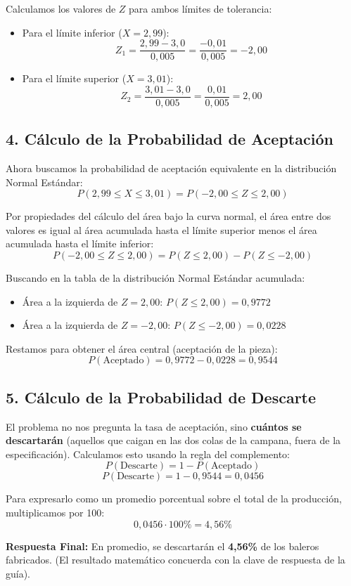 \documentclass[11pt, a4paper]{article}
\begin{document}
Calculamos los valores de $Z$ para ambos límites de tolerancia:
\begin{itemize}
    \item Para el límite inferior ($X = 2,99$): 
    \[ Z_1 = \frac{2,99 - 3,0}{0,005} = \frac{-0,01}{0,005} = -2,00 \]
    
    \item Para el límite superior ($X = 3,01$): 
    \[ Z_2 = \frac{3,01 - 3,0}{0,005} = \frac{0,01}{0,005} = 2,00 \]
\end{itemize}

\subsection*{4. Cálculo de la Probabilidad de Aceptación}
Ahora buscamos la probabilidad de aceptación equivalente en la distribución Normal Estándar:
\[ P(2,99 \le X \le 3,01) = P(-2,00 \le Z \le 2,00) \]

Por propiedades del cálculo del área bajo la curva normal, el área entre dos valores es igual al área acumulada hasta el límite superior menos el área acumulada hasta el límite inferior:
\[ P(-2,00 \le Z \le 2,00) = P(Z \le 2,00) - P(Z \le -2,00) \]

Buscando en la tabla de la distribución Normal Estándar acumulada:
\begin{itemize}
    \item Área a la izquierda de $Z = 2,00$: $P(Z \le 2,00) = 0,9772$
    \item Área a la izquierda de $Z = -2,00$: $P(Z \le -2,00) = 0,0228$
\end{itemize}

Restamos para obtener el área central (aceptación de la pieza):
\[ P(\text{Aceptado}) = 0,9772 - 0,0228 = 0,9544 \]

\subsection*{5. Cálculo de la Probabilidad de Descarte}
El problema no nos pregunta la tasa de aceptación, sino \textbf{cuántos se descartarán} (aquellos que caigan en las dos colas de la campana, fuera de la especificación). 
Calculamos esto usando la regla del complemento:
\[ P(\text{Descarte}) = 1 - P(\text{Aceptado}) \]
\[ P(\text{Descarte}) = 1 - 0,9544 = 0,0456 \]

Para expresarlo como un promedio porcentual sobre el total de la producción, multiplicamos por 100:
\[ 0,0456 \cdot 100\% = 4,56\% \]

\vspace{0.5cm}
\noindent\textbf{Respuesta Final:} En promedio, se descartarán el \textbf{4,56\%} de los baleros fabricados. (El resultado matemático concuerda con la clave de respuesta de la guía).
\end{document}

